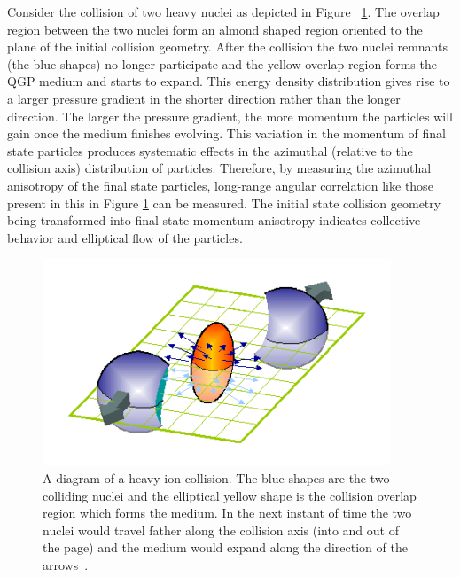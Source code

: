 Consider the collision of two heavy nuclei as depicted in Figure ~\ref{fig:flow_diagram_cart}. The overlap region between the two nuclei form an almond shaped region oriented to the plane of the initial collision geometry. After the collision the two nuclei remnants (the blue shapes) no longer participate and the yellow overlap region forms the QGP medium and starts to expand. This energy density distribution gives rise to a larger pressure gradient in the shorter direction rather than the longer direction. The larger the pressure gradient, the more momentum the particles will gain once the medium finishes evolving. This variation in the momentum of final state particles produces systematic effects in the azimuthal (relative to the collision axis) distribution of particles. Therefore, by measuring the azimuthal anisotropy of the final state particles, long-range angular correlation like those present in this in Figure \ref{fig:flow_diagram_cart} can be measured. The initial state collision geometry being transformed into final state momentum anisotropy indicates collective behavior and elliptical flow of the particles.

\begin{figure}[!ht]
\begin{center}
\includegraphics[width=0.5\linewidth]{figs/flow_diagram_cartoon.png}
\caption{A diagram of a heavy ion collision. The blue shapes are the two colliding nuclei and the elliptical yellow shape is the collision overlap region which forms the medium. In the next instant of time the two nuclei would travel father along the collision axis (into and out of the page) and the medium would expand along the direction of the arrows~\cite{Qin:2015nma}.}
\end{center}
\label{fig:flow_diagram_cart}
\end{figure}

